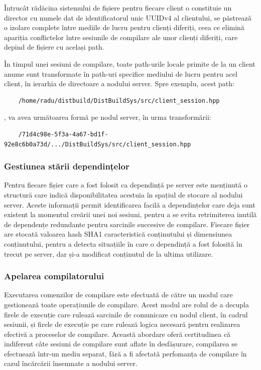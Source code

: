Întrucât rădăcina sistemului de fișiere pentru fiecare client o constituie un director cu numele dat de identificatorul unic UUIDv4 al clientului,
se păstrează o izolare complete între mediile de lucru pentru clienți diferiți, ceea ce elimină apariția conflictelor între sesiunile de compilare
ale unor clienți diferiți, care depind de fișiere cu același path.

În timpul unei sesiuni de compilare, toate path-urile locale primite de la un client anume sunt transformate în path-uri specifice mediului de lucru pentru
acel client, în ierarhia de directoare a nodului server. Spre exemplu, acest path:

\begin{verbatim}
    /home/radu/distbuild/DistBuildSys/src/client_session.hpp
\end{verbatim}

, va avea următoarea formă pe nodul server, în urma transformării:

\begin{verbatim}
    /71d4c98e-5f3a-4a67-bd1f-92e8c6b0a73d/.../DistBuildSys/src/client_session.hpp
\end{verbatim}

\subsubsection{Gestiunea stării dependințelor}

Pentru fiecare fișier care a fost folosit ca dependință pe server este menținută o structură care indică disponibilitatea acestuia
în spațiul de stocare al nodului server. Aceste informații permit identificarea facilă a dependințelor care deja sunt existent la momentul
creării unei noi sesiuni, pentru a se evita retrimiterea inutilă de dependențe redundante pentru sarcinile succesive de compilare. Fiecare fișier
are stocată valoarea hash SHA1 caracteristică conținutului și dimensiunea conținutului, pentru a detecta situațiile în care o dependință a fost folosită
în trecut pe server, dar și-a modificat conținutul de la ultima utilizare.

\subsubsection{Apelarea compilatorului}

Executarea comenzilor de compilare este efectuată de către un modul care gestionează toate operațiunile de compilare. Acest modul
are rolul de a decupla firele de execuție care rulează sarcinile de comunicare cu nodul client, în cadrul sesiunii, și firele de execuție
pe care rulează logica necesară pentru realizarea efectivă a proceselor de compilare. Această abordare oferă certitudinea că indiferent câte sesiuni 
de compilare sunt aflate în desfășurare, compilarea se efectuează într-un mediu separat, fără a fi afectată perfomanța de compilare în cazul
încărcării însemnate a nodului server.

